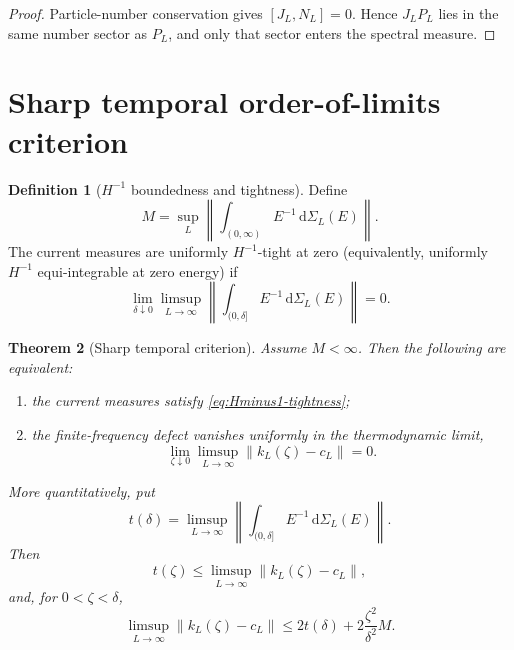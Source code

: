 \documentclass[11pt]{article}
\newtheorem{theorem}{Theorem}[section]
\theoremstyle{definition}
\newtheorem{definition}[theorem]{Definition}
\theoremstyle{remark}
\newcommand{\dd}{\mathrm d}
\newcommand{\norm}[1]{\lVert #1\rVert}
\begin{document}
\begin{proof}
Particle-number conservation gives $[J_L,N_L]=0$.  Hence $J_LP_L$ lies in the same number sector as
$P_L$, and only that sector enters the spectral measure.
\end{proof}

\section{Sharp temporal order-of-limits criterion}
\label{sec:Hminus1}

\begin{definition}[$H^{-1}$ boundedness and tightness]
Define
\begin{equation}
 M=\sup_L\left\|\int_{(0,\infty)}E^{-1}\,\dd\Sigma_L(E)\right\|.
 \label{eq:Hminus1-bound}
\end{equation}
The current measures are uniformly $H^{-1}$-tight at zero (equivalently, uniformly $H^{-1}$ equi-integrable at zero energy) if
\begin{equation}
 \lim_{\delta\downarrow0}\limsup_{L\to\infty}
 \left\|\int_{(0,\delta]}E^{-1}\,\dd\Sigma_L(E)\right\|=0.
 \label{eq:Hminus1-tightness}
\end{equation}
\end{definition}

\begin{theorem}[Sharp temporal criterion]
\label{thm:sharp-temporal}
Assume $M<\infty$.  Then the following are equivalent:
\begin{enumerate}[label=\textup{(\roman*)},leftmargin=2.6em]
\item the current measures satisfy \eqref{eq:Hminus1-tightness};
\item the finite-frequency defect vanishes uniformly in the thermodynamic limit,
\begin{equation}
 \lim_{\zeta\downarrow0}\limsup_{L\to\infty}
 \norm{k_L(\zeta)-c_L}=0.
 \label{eq:uniform-defect-zero}
\end{equation}
\end{enumerate}
More quantitatively, put
\begin{equation}
 t(\delta)=\limsup_{L\to\infty}
 \left\|\int_{(0,\delta]}E^{-1}\,\dd\Sigma_L(E)\right\|.
\end{equation}
Then
\begin{equation}
 t(\zeta)
 \le\limsup_{L\to\infty}\norm{k_L(\zeta)-c_L},
 \label{eq:lower-tail-bound}
\end{equation}
and, for $0<\zeta<\delta$,
\begin{equation}
 \limsup_{L\to\infty}\norm{k_L(\zeta)-c_L}
 \le2t(\delta)+2\frac{\zeta^2}{\delta^2}M.
 \label{eq:upper-tail-bound}
\end{equation}
\end{theorem}
\end{document}
